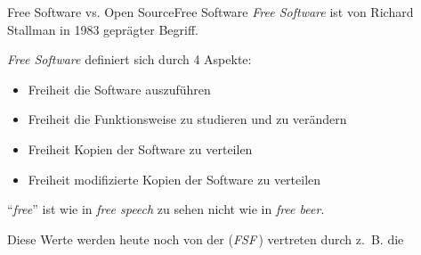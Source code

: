 \documentclass{setbeamer}
\begin{document}
\begin{frame}{Free Software vs. Open Source}{Free Software}
    \emph{Free Software} ist von Richard Stallman in 1983 geprägter Begriff.

    \vspace{0.3cm}

    \emph{Free Software} definiert sich durch 4 Aspekte:
    \begin{itemize}
        \item Freiheit die Software auszuführen
        \item Freiheit die Funktionsweise zu studieren und zu verändern
        \item Freiheit Kopien der Software zu verteilen
        \item Freiheit modifizierte Kopien der Software zu verteilen
    \end{itemize}
    {\Large \MVRightarrow} ``\emph{free}'' ist wie in \emph{free speech} zu sehen nicht wie in \emph{free beer}.

    \vspace{0.3cm}

    Diese Werte werden heute noch von der  (\emph{FSF}\,) vertreten durch z.~B. die 
\end{frame}
\end{document}
